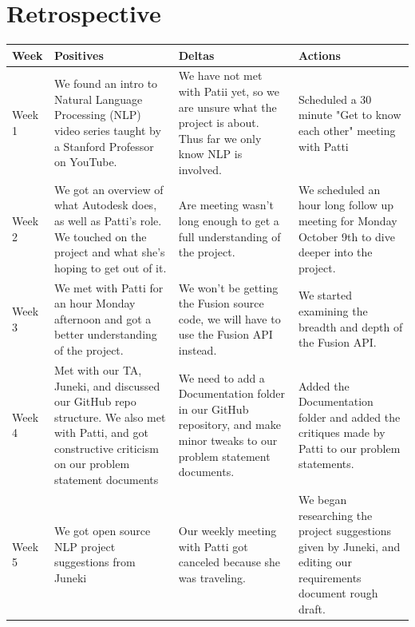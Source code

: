 \documentclass[onecolumn, draftclsnofoot,10pt, compsoc]{IEEEtran}
\begin{document}
\section{Retrospective}
		\begin{center}
	\begin{longtabu} to \textwidth {|
			X[2,l]|
			X[5,l]|
			X[5,c]|
			X[5,l]|}
		\hline
		\textbf{Week} & \textbf{Positives} & \textbf{Deltas} & \textbf{Actions} \\ \hline
		
		Week 1 
		& 
		{We found an intro to Natural Language Processing (NLP) video series taught by a Stanford Professor on YouTube.}
		& 
		{We have not met with Patii yet, so we are unsure what the project is about. Thus far we only know NLP is involved.}
		& 
		{Scheduled a 30 minute "Get to know each other" meeting with Patti}
		\\ \hline
		
		Week 2 
		&  
		{We got an overview of what Autodesk does, as well as Patti's role. We touched on the project and what she's hoping to get out of it.}
		&
		{Are meeting wasn't long enough to get a full understanding of the project.}
		&  
		{We scheduled an hour long follow up meeting for Monday October 9th to dive deeper into the project.}  
		\\ \hline
		
		Week 3 
		&
		{We met with Patti for an hour Monday afternoon and got a better understanding of the project.} 
		& 
		{We won't be getting the Fusion source code, we will have to use the Fusion API instead.} 
		&
		{We started examining the breadth and depth of the Fusion API.} 
		\\ \hline
		
		Week 4 
		&
		{Met with our TA, Juneki, and discussed our GitHub repo structure.
		We also met with Patti, and got constructive criticism on our problem statement documents} 
		& 
		{We need to add a Documentation folder in our GitHub repository, and make minor tweaks to our problem statement documents.} 
		& 
		{Added the Documentation folder and added the critiques made by Patti to our problem statements.} 
		\\ \hline
		
		Week 5 
		&
		{We got open source NLP project suggestions from Juneki} 
		& 
		{Our weekly meeting with Patti got canceled because she was traveling.} 
		& 
		{We began researching the project suggestions given by Juneki, and editing our requirements document rough draft.} 
		\\ \hline
		

\end{longtabu}
\end{center}
\end{document}
